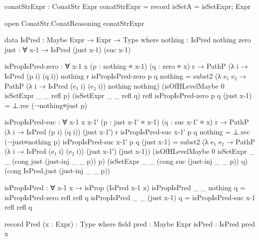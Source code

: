 \begin{code}[hide]
  conatStrExpr : ConatStr Expr
  conatStrExpr = record{ isSetA = isSetExpr; Expr }

  open ConatStr.ConatReasoning conatStrExpr

  data IsPred : Maybe Expr → Expr → Type where
    nothing : IsPred nothing zero
    just : ∀ x-1 → IsPred (just x-1) (suc x-1)

  isPropIsPred-zero :
    ∀ {x-1 x} (p : nothing ≡ x-1) (q : zero ≡ x) r →
    PathP (λ i → IsPred (p i) (q i)) nothing r
  isPropIsPred-zero p q nothing =
    subst2 (λ e₁ e₂ → PathP (λ i → IsPred (e₁ i) (e₂ i)) nothing nothing)
      (isOfHLevelMaybe 0 isSetExpr _ _ refl p)
      (isSetExpr _ _ refl q)
      refl
  isPropIsPred-zero p q (just x-1) = ⊥.rec (¬nothing≡just p)

  isPropIsPred-suc :
    ∀ {x-1 x} x-1′ (p : just x-1′ ≡ x-1) (q : suc x-1′ ≡ x) r →
    PathP (λ i → IsPred (p i) (q i)) (just x-1′) r
  isPropIsPred-suc x-1′ p q nothing = ⊥.rec (¬just≡nothing p)
  isPropIsPred-suc x-1′ p q (just x-1) =
    subst2 (λ e₁ e₂ → PathP (λ i → IsPred (e₁ i) (e₂ i)) (just x-1′) (just x-1))
      (isOfHLevelMaybe 0 isSetExpr _ _ (cong just (just-inj _ _ p)) p)
      (isSetExpr _ _ (cong suc (just-inj _ _ p)) q)
      (cong IsPred.just (just-inj _ _ p))

  isPropIsPred : ∀ x-1 x → isProp (IsPred x-1 x)
  isPropIsPred _ _ nothing q = isPropIsPred-zero refl refl q
  isPropIsPred _ _ (just x-1) q = isPropIsPred-suc x-1 refl refl q
\end{code}
\begin{code}
  record Pred (x : Expr) : Type where
    field
      pred : Maybe Expr
      isPred : IsPred pred x
\end{code}
